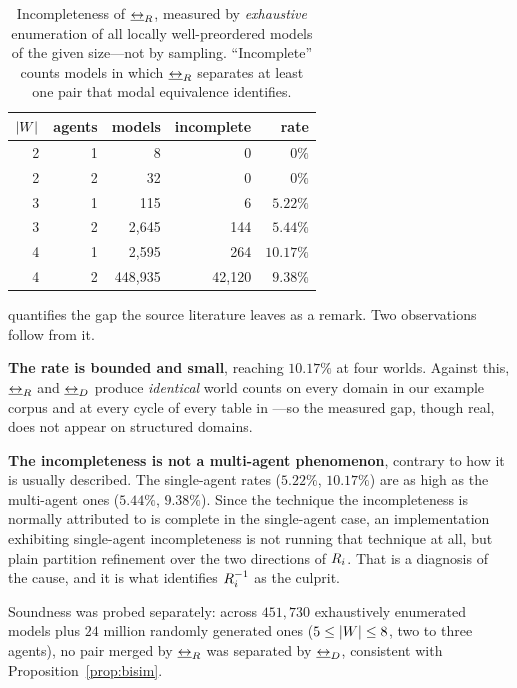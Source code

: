 \documentclass[11pt,a4paper]{article}
\begin{document}
\begin{table}[t]
\centering
\begin{tabular}{@{}rrrrr@{}}
\toprule
$|W|$ & agents & models & incomplete & rate \\
\midrule
2 & 1 & 8       & 0      & $0\%$ \\
2 & 2 & 32      & 0      & $0\%$ \\
3 & 1 & 115     & 6      & $5.22\%$ \\
3 & 2 & 2{,}645 & 144    & $5.44\%$ \\
4 & 1 & 2{,}595 & 264    & $10.17\%$ \\
4 & 2 & 448{,}935 & 42{,}120 & $9.38\%$ \\
\bottomrule
\end{tabular}
\caption{Incompleteness of $\mathbin{\underline{\leftrightarrow}_{R}}$, measured by \emph{exhaustive} enumeration of all
locally well-preordered models of the given size---not by sampling. ``Incomplete'' counts
models in which $\mathbin{\underline{\leftrightarrow}_{R}}$ separates at least one pair that modal equivalence identifies.}
\label{tab:gap}
\end{table}

 quantifies the gap the source literature leaves as a remark. Two observations
follow from it.

\textbf{The rate is bounded and small}, reaching $10.17\%$ at four worlds. Against this,
$\mathbin{\underline{\leftrightarrow}_{R}}$ and $\mathbin{\underline{\leftrightarrow}_{D}}$ produce \emph{identical} world counts on every domain in our example
corpus and at every cycle of every table in ---so the measured gap, though
real, does not appear on structured domains.

\textbf{The incompleteness is not a multi-agent phenomenon}, contrary to how it is usually
described. The single-agent rates ($5.22\%$, $10.17\%$) are as high as the multi-agent ones
($5.44\%$, $9.38\%$). Since the technique the incompleteness is normally attributed to is
complete in the single-agent case, an implementation exhibiting single-agent incompleteness
is not running that technique at all, but plain partition refinement over the two directions
of $R_{i}$. That is a diagnosis of the cause, and it is what identifies
$R_{i}^{-1}$ as the culprit.

Soundness was probed separately: across $451{,}730$ exhaustively enumerated models plus
$24$ million randomly generated ones ($5 \le |W| \le 8$, two to three agents), no pair
merged by $\mathbin{\underline{\leftrightarrow}_{R}}$ was separated by $\mathbin{\underline{\leftrightarrow}_{D}}$, consistent with
Proposition~\ref{prop:bisim}.

\end{document}

